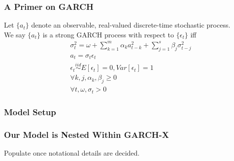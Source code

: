 \documentclass{beamer}
\newcommand{\simiid}{\stackrel{iid}{\sim}} %
\theoremstyle{definition}
\begin{document}
\begin{frame}
    \frametitle{A Primer on GARCH}

    Let $\{a_{t}\}$ denote an observable, real-valued discrete-time stochastic process.\\
    

    We say $\{a_{t}\}$ is a strong GARCH process with respect to $\{\epsilon_{t}\}$ iff 
    \begin{align*}
        &\sigma_{t}^{2} = \omega + \sum^{m}_{k=1}\alpha_{k}a^{2}_{t-k} + \sum_{j=1}^{s}\beta_{j}\sigma_{t-j}^{2}\\
        &a_{t} = \sigma_{t}\epsilon_{t}\\
        &\epsilon_{t} \simiid E[\epsilon_{t}]=0, Var[\epsilon_{t}] = 1\\
        &\forall k,j, \alpha_{k},\beta_{j}\geq 0\\ 
        &\forall t, \omega, \sigma_{t} > 0 
        \end{align*}
\end{frame}

\begin{frame}
\frametitle{Model Setup}
\end{frame}

\begin{frame}
\frametitle{Our Model is Nested Within GARCH-X}

Populate once notational details are decided.

\end{frame}
\end{document}

